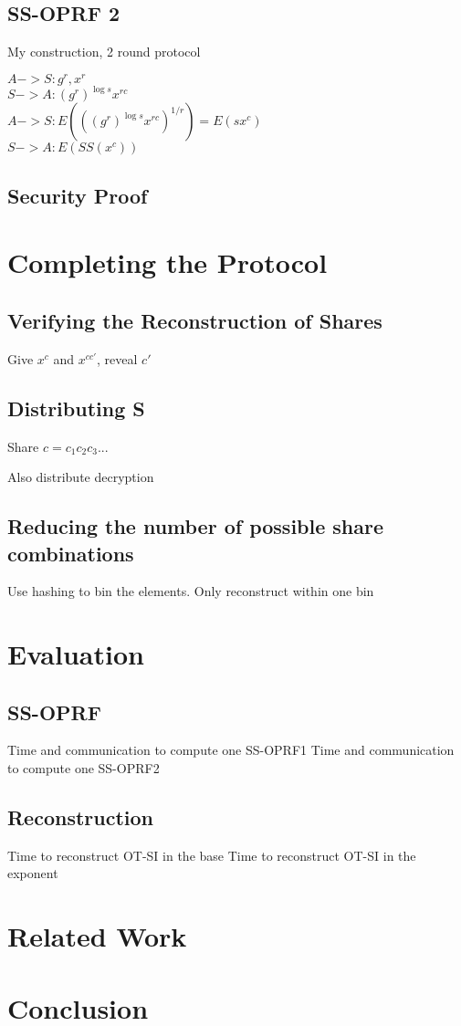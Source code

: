 \documentclass[10pt, sigconf]{acmart}
\begin{document}
\subsection{SS-OPRF 2}

My construction, 2 round protocol

$A -> S: g^r, x^r$ \\
$S -> A: (g^r)^{\log s} x^{rc}$ \\
$A -> S: E(((g^r)^{\log s} x^{rc})^{1/r}) = E(s x^c)$ \\
$S -> A: E(SS(x^c))$

\subsection{Security Proof}

\section{Completing the Protocol}

\subsection{Verifying the Reconstruction of Shares}

Give $x^c$ and $x^{cc'}$, reveal $c'$

\subsection{Distributing S}

Share $c = c_1 c_2 c_3 ...$

Also distribute decryption

\subsection{Reducing the number of possible share combinations}

Use hashing to bin the elements.  Only reconstruct within one bin

\section{Evaluation}

\subsection{SS-OPRF}

Time and communication to compute one SS-OPRF1
Time and communication to compute one SS-OPRF2

\subsection{Reconstruction}

Time to reconstruct OT-SI in the base
Time to reconstruct OT-SI in the exponent

\section{Related Work}


\section{Conclusion}



\end{document}
